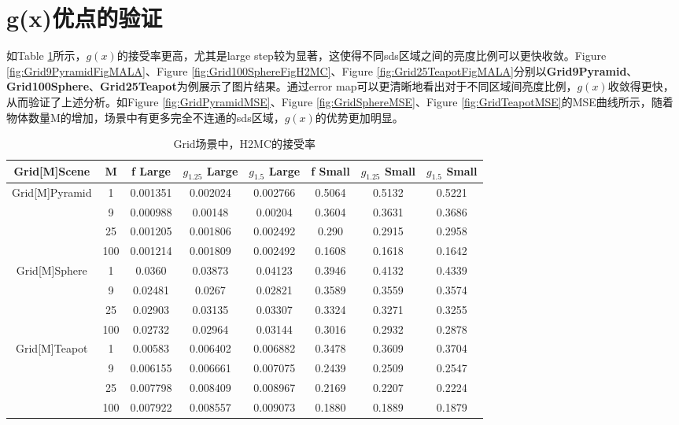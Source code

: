 
\section{g(x)优点的验证}
\label{sec:benefit}
如Table \ref{tab:accept}所示，$g(x)$的接受率更高，尤其是large step较为显著，这使得不同sds区域之间的亮度比例可以更快收敛。Figure \ref{fig:Grid9PyramidFigMALA}、Figure \ref{fig:Grid100SphereFigH2MC}、Figure \ref{fig:Grid25TeapotFigMALA}分别以\textbf{Grid9Pyramid}、\textbf{Grid100Sphere}、\textbf{Grid25Teapot}为例展示了图片结果。通过error map可以更清晰地看出对于不同区域间亮度比例，$g(x)$收敛得更快，从而验证了上述分析。如Figure \ref{fig:GridPyramidMSE}、Figure \ref{fig:GridSphereMSE}、Figure \ref{fig:GridTeapotMSE}的MSE曲线所示，随着物体数量M的增加，场景中有更多完全不连通的sds区域，$g(x)$的优势更加明显。

\begin{table}[hb]
\centering
\begin{tabular}{|c|c|c|c|c|c|c|c|}
\hline
Grid[M]Scene & M & f Large & $g_{1.25}$ Large & $g_{1.5}$ Large & f Small & $g_{1.25}$ Small & $g_{1.5}$ Small \\
\hline
\multirow{4}{*}{Grid[M]Pyramid} & 1 & 0.001351 & 0.002024 & 0.002766 & 0.5064 & 0.5132 & 0.5221\\
\cline{2-8} & 9 & 0.000988 & 0.00148 & 0.00204 & 0.3604 & 0.3631 & 0.3686\\
\cline{2-8} & 25 & 0.001205 & 0.001806 & 0.002492 & 0.290 & 0.2915 & 0.2958\\
\cline{2-8} & 100 & 0.001214 & 0.001809 & 0.002492 & 0.1608 & 0.1618 & 0.1642\\
\hline
\multirow{4}{*}{Grid[M]Sphere} & 1 & 0.0360 & 0.03873 & 0.04123 & 0.3946 & 0.4132 & 0.4339\\
\cline{2-8} & 9 & 0.02481 & 0.0267 & 0.02821 & 0.3589 & 0.3559 & 0.3574\\
\cline{2-8} & 25 & 0.02903 & 0.03135 & 0.03307 & 0.3324 & 0.3271 & 0.3255\\
\cline{2-8} & 100 & 0.02732 & 0.02964 & 0.03144 & 0.3016 & 0.2932 & 0.2878\\
\hline
\multirow{4}{*}{Grid[M]Teapot} & 1 & 0.00583 & 0.006402 & 0.006882 & 0.3478 & 0.3609 & 0.3704\\
\cline{2-8} & 9 & 0.006155 & 0.006661 & 0.007075 & 0.2439 & 0.2509 & 0.2547\\
\cline{2-8} & 25  & 0.007798 & 0.008409 & 0.008967 & 0.2169 & 0.2207 & 0.2224\\
\cline{2-8} & 100 & 0.007922 & 0.008557 & 0.009073 & 0.1880 & 0.1889 & 0.1879\\
\hline
\end{tabular}
\caption{Grid场景中，H2MC的接受率}
\label{tab:accept}
\end{table}

\clearpage


\clearpage



